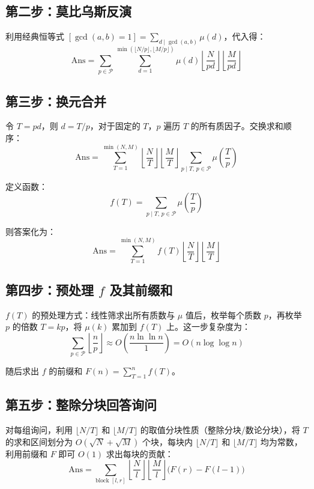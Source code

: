 \documentclass[11pt,a4paper,twocolumn]{ctexart}  %
\begin{document}
\subsection*{第二步：莫比乌斯反演}

利用经典恒等式 $[\gcd(a,b)=1] = \sum_{d \mid \gcd(a,b)} \mu(d)$，代入得：
\[
    \mathrm{Ans} = \sum_{p \in \mathcal{P}} \sum_{d=1}^{\min(\lfloor N/p \rfloor, \lfloor M/p \rfloor)} \mu(d) \left\lfloor \frac{N}{pd} \right\rfloor \left\lfloor \frac{M}{pd} \right\rfloor
\]

\subsection*{第三步：换元合并}

令 $T = pd$，则 $d = T/p$，对于固定的 $T$，$p$ 遍历 $T$ 的所有质因子。交换求和顺序：
\[
    \mathrm{Ans} = \sum_{T=1}^{\min(N,M)} \left\lfloor \frac{N}{T} \right\rfloor \left\lfloor \frac{M}{T} \right\rfloor \sum_{p \mid T,\, p \in \mathcal{P}} \mu\!\left(\frac{T}{p}\right)
\]

定义函数：
\[
    f(T) = \sum_{p \mid T,\, p \in \mathcal{P}} \mu\!\left(\frac{T}{p}\right)
\]

则答案化为：
\[
    \mathrm{Ans} = \sum_{T=1}^{\min(N,M)} f(T) \left\lfloor \frac{N}{T} \right\rfloor \left\lfloor \frac{M}{T} \right\rfloor
\]

\subsection*{第四步：预处理 $f$ 及其前缀和}

$f(T)$ 的预处理方式：线性筛求出所有质数与 $\mu$ 值后，枚举每个质数 $p$，再枚举 $p$ 的倍数 $T = kp$，将 $\mu(k)$ 累加到 $f(T)$ 上。这一步复杂度为：
\[
    \sum_{p \in \mathcal{P}} \left\lfloor \frac{n}{p} \right\rfloor \approx O\!\left(\frac{n \ln \ln n}{1}\right) = O(n \log \log n)
\]

随后求出 $f$ 的前缀和 $F(n) = \sum_{T=1}^{n} f(T)$。

\subsection*{第五步：整除分块回答询问}

对每组询问，利用 $\lfloor N/T \rfloor$ 和 $\lfloor M/T \rfloor$ 的取值分块性质（整除分块/数论分块），将 $T$ 的求和区间划分为 $O(\sqrt{N} + \sqrt{M})$ 个块，每块内 $\lfloor N/T \rfloor$ 和 $\lfloor M/T \rfloor$ 均为常数，利用前缀和 $F$ 即可 $O(1)$ 求出每块的贡献：
\[
    \mathrm{Ans} = \sum_{\text{block } [l,r]} \left\lfloor \frac{N}{l} \right\rfloor \left\lfloor \frac{M}{l} \right\rfloor \bigl(F(r) - F(l-1)\bigr)
\]
\end{document}
